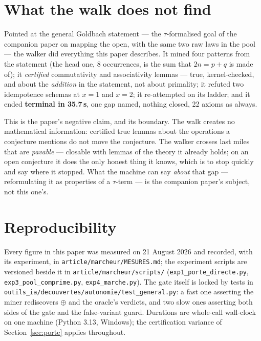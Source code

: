 \documentclass[11pt]{article}
\theoremstyle{remark}\newtheorem{remark}{Remark}
\begin{document}
\section{What the walk does not find}
\label{sec:limites-goldbach}

Pointed at the general Goldbach statement --- the $\tau$-formalised goal of
the companion paper on mapping the open, with the same two raw laws in the
pool --- the walker did everything this paper describes. It mined four
patterns from the statement (the head one, 8 occurrences, is the sum that
$2n = p+q$ is made of); it \emph{certified} commutativity and associativity
lemmas --- true, kernel-checked, and about the \emph{addition} in the
statement, not about primality; it refuted two idempotence schemas at $x=1$
and $x=2$; it re-attempted on its ladder; and it ended \textbf{terminal in
35.7\,s}, one gap named, nothing closed, 22 axioms as always.

This is the paper's negative claim, and its boundary. The walk creates no
mathematical information: certified true lemmas about the operations a
conjecture mentions do not move the conjecture. The walker crosses last
miles that are \emph{pavable} --- closable with lemmas of the theory it
already holds; on an open conjecture it does the only honest thing it knows,
which is to stop quickly and say where it stopped. What the machine can say
\emph{about} that gap --- reformulating it as properties of a $\tau$-term
--- is the companion paper's subject, not this one's.

\section{Reproducibility}
\label{sec:repro}

Every figure in this paper was measured on 21 August 2026 and recorded, with
its experiment, in \texttt{article/marcheur/MESURES.md}; the experiment
scripts are versioned beside it in \texttt{article/marcheur/scripts/}
(\texttt{exp1\_porte\_directe.py}, \texttt{exp3\_pool\_comprime.py},
\texttt{exp4\_marche.py}). The gate itself is locked by tests in
\texttt{outils\_ia/decouvertes/autonomie/test\_general.py}: a fast one
asserting the miner rediscovers $\oplus$ and the oracle's verdicts, and two
slow ones asserting both sides of the gate and the false-variant guard.
Durations are whole-call wall-clock on one machine (Python 3.13, Windows);
the certification variance of Section~\ref{sec:porte} applies throughout.
\end{document}
